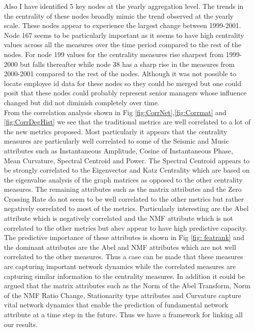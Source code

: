 Also I have identified 5 key nodes at the yearly aggregation level. The trends in the centrality of these nodes broadly mimic the trend observed at the yearly scale. These nodes appear to experience the largest change between 1999-2001. Node 167 seems to be particularly important as it seems to have high centrality values across all the measures over the time period compared to the rest of the nodes. For node 199 values for the centrality measures rise sharpest from 1999-2000 but falls thereafter while node 38 has a sharp rise in the measures from 2000-2001 compared to the rest of the nodes. Although it was not possible to locate employee id data for these nodes so they could be merged but one could posit that these nodes could probably represent senior managers whose influence changed but did not diminish completely over time. \\

From the correlation analysis shown in Fig \ref{fig:CorrNet},\ref{fig:Corrmat} and \ref{fig:CorrDegHist} we see that the traditional metrics are well correlated to a lot of the new metrics proposed. Most particularly it appears that the centrality measures are particularly well correlated to some of the Seismic and Music attributes such as Instantaneous Amplitude, Cosine of Instantaneous Phase, Mean Curvature, Spectral Centroid and Power. The Spectral Centroid appears to be strongly correlated to the Eigenvector and Katz Centrality which are based on the eigenvalue analysis of the graph matrices as opposed to the other centrality measures. The remaining attributes such as the matrix attributes and the Zero Crossing Rate do not seem to be well correlated to the other metrics but rather negatively correlated to most of the metrics. Particularly interesting are the Abel attribute which is negatively correlated and the NMF attribute which is not correlated to the other metrics but ahev appear to have high predictive capacity. The predictive importance of these attributes is shown in Fig \ref{fig: featrank} and the dominant attributes are the Abel and NMF attributes which are not well correlated to the other measures. Thus a case can be made that these measures are capturing important network dynamics while the correlated measures are capturing similar information to the centrality measures. In addition it could be argued that the matrix attributes such as the Norm of the Abel Transform, Norm of the NMF Ratio Change, Stationarity type attributes and Curvature capture vital network dynamics that enable the prediction of fundamental network attribute at a time step in the future. Thus we have a framework for linking all our results.\\


